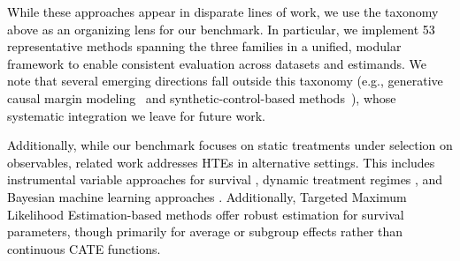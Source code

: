 \documentclass{article} %
\newcommand{\rebuttal}[1]{\textcolor{black}{#1}}
\begin{document}
\rebuttal{While these approaches appear in disparate lines of work, we use the taxonomy above as an organizing lens for our benchmark. In particular, we implement 53 representative methods spanning the three families in a unified, modular framework to enable consistent evaluation across datasets and estimands. We note that several emerging directions fall outside this taxonomy (e.g., generative causal margin modeling~\citep{yang2025frugal} and synthetic-control-based methods~\citep{curth2024cautionary, han2025synthetic}), whose systematic integration we leave for future work.}

\rebuttal{Additionally, while our benchmark focuses on static treatments under selection on observables, related work addresses HTEs in alternative settings. This includes instrumental variable approaches for survival \citep{tchetgen2015instrumental}, dynamic treatment regimes \citep{rudolph2022estimation,bates2022nonlinear,rudolph2023estimation,cho2023multi}, and Bayesian machine learning approaches \citep{chen2024bayesian}. Additionally, Targeted Maximum Likelihood Estimation-based methods \citep{stitelman2010collaborative,stitelman2011targeted} offer robust estimation for survival parameters, though primarily for average or subgroup effects rather than continuous CATE functions.}


\end{document}
